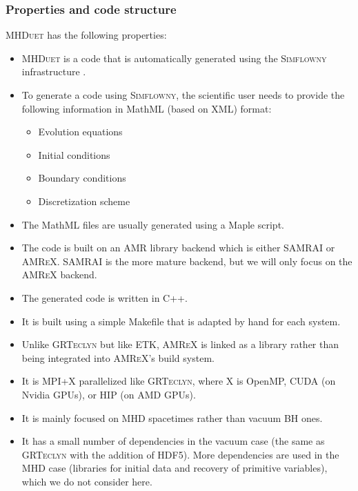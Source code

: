 \documentclass[12pt,a4paper]{article}
\numberwithin{figure}{subsection}
\newcommand{\etk}{\textsc{ETK}\xspace} %
\newcommand{\grteclyn}{\textsc{GRTeclyn}\xspace}
\newcommand{\mhduet}{\textsc{MHDuet}\xspace}
\newcommand{\amrex}{\textsc{AMReX}\xspace}
\newcommand{\simflowny}{\textsc{Simflowny}\xspace}
\begin{document}
\subsubsection{Properties and code structure}
\mhduet has the following properties:
\begin{itemize}
    \item \mhduet is a code that is automatically generated using the
    \simflowny infrastructure \cite{Palenzuela:2021a,Arbona:2013a}.
    \item To generate a code using \textsc{Simflowny}, the scientific user needs
    to provide the following information in MathML (based on XML) format:
    \begin{itemize}
        \item Evolution equations
        \item Initial conditions
        \item Boundary conditions
        \item Discretization scheme
    \end{itemize}
    \item The MathML files are usually generated using a Maple script.
    \item The code is built on an AMR library backend which is either SAMRAI
    \cite{Hornung:2002a} or \amrex. SAMRAI is the more mature backend, but we
    will only focus on the \amrex backend.
    \item The generated code is written in C++.
    \item It is built using a simple Makefile that is adapted by hand for each
    system.
    \item Unlike \grteclyn but like \etk, \amrex is linked as a library rather
    than being integrated into \amrex's build system.
    \item It is MPI+X parallelized like \grteclyn, where X is OpenMP, CUDA (on
    Nvidia GPUs), or HIP (on AMD GPUs).
    \item It is mainly focused on MHD spacetimes rather than vacuum BH ones.
    \item It has a small number of dependencies in the vacuum case (the same as
    \grteclyn with the addition of HDF5). More dependencies are used in the MHD
    case (libraries for initial data and recovery of primitive variables), which
    we do not consider here.
\end{itemize}
\end{document}

